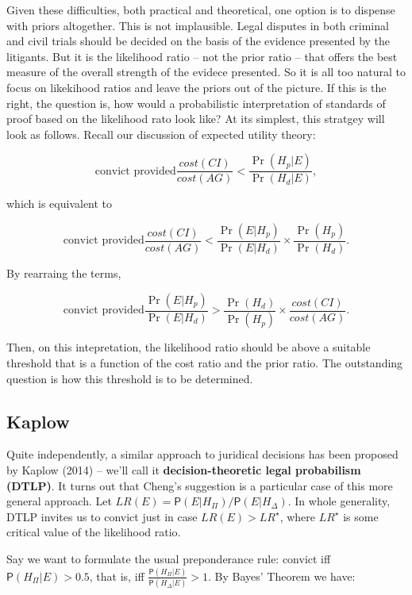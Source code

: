 \documentclass[10pt,dvipsnames,enabledeprecatedfontcommands]{scrartcl}
\newcommand{\pr}[1]{\mathsf{P}(#1)}
\begin{document}
Given these difficulties, both practical and theoretical, one option is
to dispense with priors altogether. This is not implausible. Legal
disputes in both criminal and civil trials should be decided on the
basis of the evidence presented by the litigants. But it is the
likelihood ratio -- not the prior ratio -- that offers the best measure
of the overall strength of the evidece presented. So it is all too
natural to focus on likekihood ratios and leave the priors out of the
picture. If this is the right, the question is, how would a
probabilistic interpretation of standards of proof based on the
likelihood rato look like? At its simplest, this stratgey will look as
follows. Recall our discussion of expected utility theory:

\[ \text{convict provided}           \frac{cost(CI)}{cost(AG)} < \frac{\Pr(H_p | E)}{\Pr(H_d | E )}, \]

which is equivalent to

\[ \text{convict provided}           \frac{cost(CI)}{cost(AG)} < \frac{\Pr(E | H_p)}{\Pr(E | H_d)} \times \frac{\Pr(H_p)}{\Pr(H_d)}.\]

By rearraing the terms,

\[ \text{convict provided}  \frac{\Pr(E | H_p)}{\Pr(E | H_d)} > \frac{\Pr(H_d)}{\Pr(H_p)} \times     \frac{cost(CI)}{cost(AG)} .\]

Then, on this intepretation, the likelihood ratio should be above a
suitable threshold that is a function of the cost ratio and the prior
ratio. The outstanding question is how this threshold is to be
determined.

\hypertarget{kaplow}{%
\subsection{Kaplow}\label{kaplow}}

Quite independently, a similar approach to juridical decisions has been
proposed by Kaplow (2014) -- we'll call it
\textbf{decision-theoretic legal probabilism (DTLP)}. It turns out that
Cheng's suggestion is a particular case of this more general approach.
Let \(LR(E)=\pr{E\vert H_\Pi}/\pr{E\vert H_\Delta}\). In whole
generality, DTLP invites us to convict just in case \(LR(E)>LR^\star\),
where \(LR^\star\) is some critical value of the likelihood ratio.

Say we want to formulate the usual preponderance rule: convict iff
\(\pr{H_\Pi\vert E}>0.5\), that is, iff
\(\frac{\pr{H_\Pi\vert E}}{\pr{H_\Delta\vert E}}>1\). By Bayes' Theorem
we have:
\end{document}
